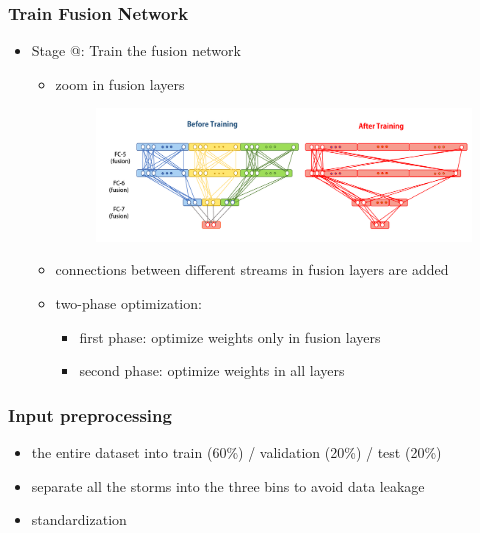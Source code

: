 \documentclass{beamer}
\makeatletter
\newcommand{\Rmnum}[1]{\expandafter\@slowromancap\romannumeral #1@}
\makeatother
\begin{document}
\begin{frame}
\frametitle{Train Fusion Network}
\begin{itemize}
	\item  Stage \Rmnum{2}: Train the fusion network \\
	\begin{itemize}
		\item  zoom in fusion layers
		\begin{figure}
			\flushleft
			\includegraphics[width=0.65\linewidth]{figs/fusion_details.pdf} \\
		\end{figure}
		\item connections between different streams in fusion layers are added
		\item two-phase optimization:
			\begin{itemize}
				\item first phase: optimize weights only in fusion layers
				\item second phase: optimize weights in all layers
			\end{itemize}
	\end{itemize}
\end{itemize}
\end{frame}

\begin{frame}
\frametitle{Input preprocessing}
\begin{itemize}
	\item  the entire dataset into train (60\%) / validation (20\%) / test (20\%)
	\item separate all the storms into the three bins to avoid data leakage
	\item standardization
\end{itemize}
\end{frame}
\end{document}

